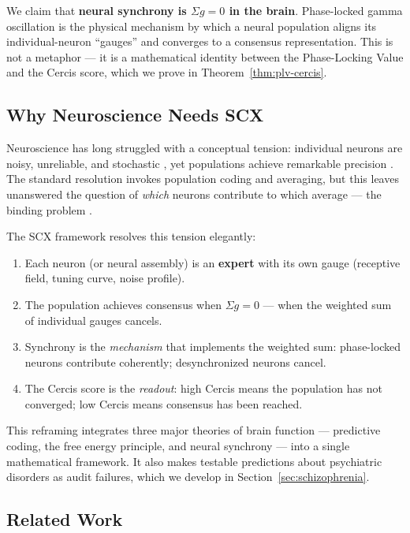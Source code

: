 \documentclass[12pt,a4paper]{article}
\theoremstyle{remark}
\newcommand{\SCX}{\textsf{SCX}}
\newcommand{\Cercis}{\textsf{Cercis}}
\begin{document}
We claim that \textbf{neural synchrony is $\Sigma g = 0$ in the brain}.
Phase-locked gamma oscillation is the physical mechanism by which a neural
population aligns its individual-neuron ``gauges'' and converges to a
consensus representation. This is not a metaphor --- it is a mathematical
identity between the Phase-Locking Value and the \Cercis{} score, which we
prove in Theorem~\ref{thm:plv-cercis}.

\subsection{Why Neuroscience Needs SCX}

Neuroscience has long struggled with a conceptual tension: individual neurons
are noisy, unreliable, and stochastic \cite{faiscal2006noise,shadlen1998variable},
yet populations achieve remarkable precision \cite{pouget2013probabilistic}.
The standard resolution invokes population coding and averaging, but this
leaves unanswered the question of \emph{which} neurons contribute to which
average --- the binding problem \cite{treisman1996binding}.

The \SCX{} framework resolves this tension elegantly:
\begin{enumerate}[label=(\roman*), leftmargin=*]
    \item Each neuron (or neural assembly) is an \textbf{expert} with its own gauge (receptive field, tuning curve, noise profile).
    \item The population achieves consensus when $\Sigma g = 0$ --- when the weighted sum of individual gauges cancels.
    \item Synchrony is the \emph{mechanism} that implements the weighted sum: phase-locked neurons contribute coherently; desynchronized neurons cancel.
    \item The \Cercis{} score is the \emph{readout}: high \Cercis{} means the population has not converged; low \Cercis{} means consensus has been reached.
\end{enumerate}

This reframing integrates three major theories of brain function ---
predictive coding, the free energy principle, and neural synchrony --- into a
single mathematical framework. It also makes testable predictions about
psychiatric disorders as audit failures, which we develop in
Section~\ref{sec:schizophrenia}.

\subsection{Related Work}
\end{document}
